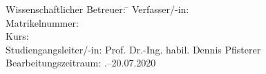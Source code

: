 \begin{titlepage}
\begin{center}
\begin{minipage}{\textwidth}
\begin{tabbing}
	Wissenschaftlicher Betreuer: \hspace{0.85cm}\=\kill
	Verfasser/-in: \> \DerAutorDerArbeit \\[1.5mm]
	Matrikelnummer:  \\[1.5mm]
	Kurs: \> \DieKursbezeichnung \\[1.5mm]
	Studiengangsleiter/-in: \> Prof. Dr.-Ing. habil. Dennis Pfisterer \\[1.5mm]
	Bearbeitungszeitraum: .--20.07.2020
\end{tabbing}
\end{minipage}

\end{center}

\end{titlepage}